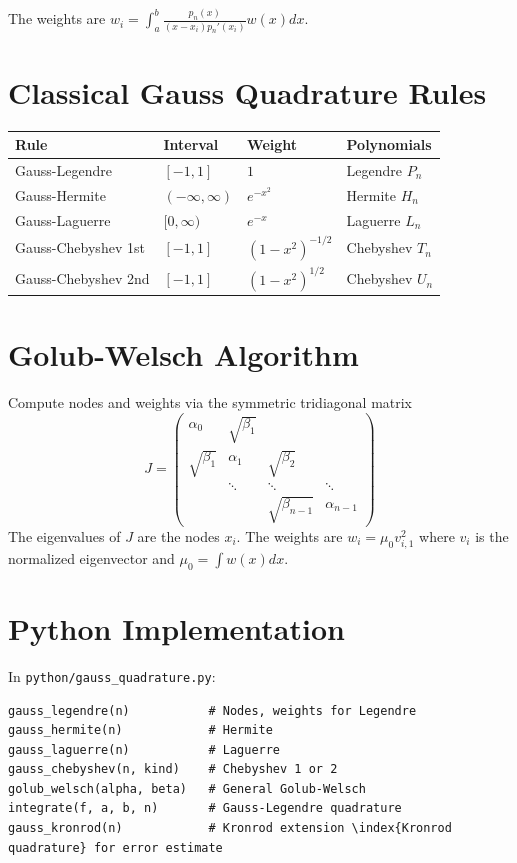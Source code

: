 The weights are $w_i = \int_a^b \frac{p_n(x)}{(x-x_i)p_n'(x_i)} w(x) dx$.

\section{Classical Gauss Quadrature Rules}

\begin{table}[H]
\centering
\begin{tabular}{llll}
\toprule
Rule & Interval & Weight & Polynomials \\
\midrule
Gauss-Legendre & $[-1,1]$ & $1$ & Legendre $P_n$ \\
Gauss-Hermite & $(-\infty,\infty)$ & $e^{-x^2}$ & Hermite $H_n$ \\
Gauss-Laguerre & $[0,\infty)$ & $e^{-x}$ & Laguerre $L_n$ \\
Gauss-Chebyshev 1st & $[-1,1]$ & $(1-x^2)^{-1/2}$ & Chebyshev $T_n$ \\
Gauss-Chebyshev 2nd & $[-1,1]$ & $(1-x^2)^{1/2}$ & Chebyshev $U_n$ \\
\bottomrule
\end{tabular}
\end{table}

\section{Golub-Welsch Algorithm}

Compute nodes and weights via the symmetric tridiagonal matrix
\[
J = \begin{pmatrix}
\alpha_0 & \sqrt{\beta_1} & & \\
\sqrt{\beta_1} & \alpha_1 & \sqrt{\beta_2} & \\
& \ddots & \ddots & \ddots \\
& & \sqrt{\beta_{n-1}} & \alpha_{n-1}
\end{pmatrix}
\]
The eigenvalues of $J$ are the nodes $x_i$. The weights are $w_i = \mu_0 v_{i,1}^2$ where $v_i$ is the normalized eigenvector and $\mu_0 = \int w(x) dx$.

\section{Python Implementation}

In \texttt{python/gauss\_quadrature.py}:

\begin{lstlisting}[style=python, caption={Key functions in python/gauss\_quadrature.py}]
gauss_legendre(n)           # Nodes, weights for Legendre
gauss_hermite(n)            # Hermite
gauss_laguerre(n)           # Laguerre
gauss_chebyshev(n, kind)    # Chebyshev 1 or 2
golub_welsch(alpha, beta)   # General Golub-Welsch
integrate(f, a, b, n)       # Gauss-Legendre quadrature
gauss_kronrod(n)            # Kronrod extension \index{Kronrod quadrature} for error estimate
\end{lstlisting}

